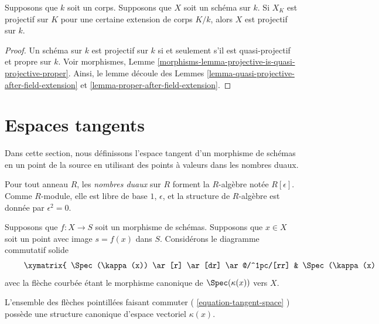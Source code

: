 \begin{lemma}
\label{lemma-projective-after-field-extension}
Supposons que $k$ soit un corps. Supposons que $X$ soit un
schéma sur $k$. Si $X_K$ est projectif sur $K$ pour une
certaine extension de corps $K/k$, alors $X$ est projectif sur $k$.
\end{lemma}

\begin{proof}
Un schéma sur $k$ est projectif sur $k$ si et
seulement s'il est quasi-projectif et propre sur $k$.
Voir morphismes, Lemme
\ref{morphisms-lemma-projective-is-quasi-projective-proper}.
Ainsi, le lemme découle des Lemmes
\ref{lemma-quasi-projective-after-field-extension} et \ref{lemma-proper-after-field-extension}.
\end{proof}




\section{Espaces tangents}
\label{section-tangent-spaces}

\noindent
Dans cette section, nous définissons l'espace tangent d'un morphisme de schémas
en un point de la source en utilisant des points à valeurs dans les nombres duaux.

\begin{definition}
\label{definition-dual-numbers}
Pour tout anneau $R$, les {\it nombres duaux } sur $R$
forment la $R$-algèbre notée $R[\epsilon]$. Comme
$R$-module, elle est libre de base $1$, $\epsilon$, et la
structure de $R$-algèbre est donnée par $\epsilon^2 = 0$.
\end{definition}

\noindent
Supposons que $f : X \to S$ soit un morphisme de schémas.
Supposons que $x \in X$ soit un point avec image $s =
f(x)$ dans $S$. Considérons le diagramme commutatif solide
\begin{equation}
\label{equation-tangent-space}
\vcenter{
\xymatrix{
\Spec(\kappa(x)) \ar[r] \ar[dr] \ar@/^1pc/[rr] &
\Spec(\kappa(x)[\epsilon]) \ar@{.>}[r] \ar[d]&
X \ar[d] \\
&
\Spec(\kappa(s)) \ar[r] &
S
}
}
\end{equation}
avec la flèche courbée étant le morphisme
canonique de $\Spec(\kappa(x))$ vers $X$.

\begin{lemma}
\label{lemma-tangent-space}
L'ensemble des flèches pointillées faisant commuter (
\ref{equation-tangent-space} ) possède une structure canonique d'espace vectoriel $\kappa(x)$.
\end{lemma}

